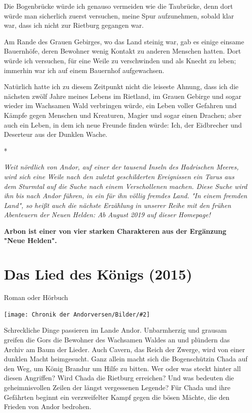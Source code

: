 \documentclass[10pt, a4paper, oneside]{book}
\newcommand{\produkt}[1]{%
    \section{#1}%
    \label{Produkt: #1}%
}
\newcommand{\bildmitts}[2][height=0.32\textwidth,width=0.48\textwidth,keepaspectratio]{%
    \begin{center}
        \texttt{[image: Chronik der Andorversen/Bilder/\#2]}
    \end{center}
}
\begin{document}
\begin{multicols}{2}
Die Bogenbrücke würde ich genauso vermeiden wie die Taubrücke, denn dort würde man sicherlich zuerst versuchen, meine Spur aufzunehmen, sobald klar war, dass ich nicht zur Rietburg gegangen war.

Am Rande des Grauen Gebirges, wo das Land steinig war, gab es einige einsame Bauernhöfe, deren Bewohner wenig Kontakt zu anderen Menschen hatten. Dort würde ich versuchen, für eine Weile zu verschwinden und als Knecht zu leben; immerhin war ich auf einem Bauernhof aufgewachsen.

Natürlich hatte ich zu diesem Zeitpunkt nicht die leiseste Ahnung, dass ich die nächsten zwölf Jahre meines Lebens im Rietland, im Grauen Gebirge und sogar wieder im Wachsamen Wald verbringen würde, ein Leben voller Gefahren und Kämpfe gegen Menschen und Kreaturen, Magier und sogar einen Drachen; aber auch ein Leben, in dem ich neue Freunde finden würde: Ich, der Eidbrecher und Deserteur aus der Dunklen Wache.

\begin{center}
    *
\end{center}

\textit{Weit nördlich von Andor, auf einer der tausend Inseln des Hadrischen Meeres, wird sich eine Weile nach den zuletzt geschilderten Ereignissen ein Tarus aus dem Sturmtal auf die Suche nach einem Verschollenen machen. Diese Suche wird ihn bis nach Andor führen, in ein für ihn völlig fremdes Land. "In einem fremden Land", so heißt auch die nächste Erzählung in unserer Reihe mit den frühen Abenteuern der Neuen Helden: Ab August 2019 auf dieser Homepage!}\bigskip

\textbf{Arbon ist einer von vier starken Charakteren aus der Ergänzung "Neue Helden".}







\produkt{Das Lied des Königs (2015)}

\begin{center}
    Roman oder Hörbuch
\end{center}

\bildmitts{Das Lied des Königs (2015).png}

Schreckliche Dinge passieren im Lande Andor. Unbarmherzig und grausam greifen die Gors die Bewohner des Wachsamen Waldes an und plündern das Archiv am Baum der Lieder. Auch Cavern, das Reich der Zwerge, wird von einer dunklen Macht heimgesucht. Ganz allein macht sich die Bogenschützin Chada auf den Weg, um König Brandur um Hilfe zu bitten. Wer oder was steckt hinter all diesen Angriffen? Wird Chada die Rietburg erreichen? Und was bedeuten die geheimnisvollen Zeilen der längst vergessenen Legende? Für Chada und ihre Gefährten beginnt ein verzweifelter Kampf gegen die bösen Mächte, die den Frieden von Andor bedrohen.


\end{multicols}
\end{document}
